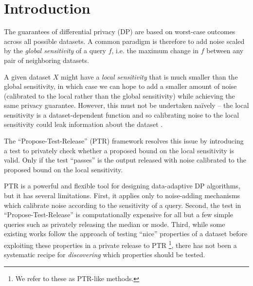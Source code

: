 \section{Introduction}
\label{sec:introduction}
The guarantees of differential privacy (DP) \citep{dwork2006calibrating} are based on worst-case outcomes across all possible datasets. A common paradigm is therefore to add noise scaled by the \emph{global sensitivity} of a query $f$, i.e. the maximum change in $f$ between any pair of neighboring datasets.

A given dataset $X$ might have a \emph{local sensitivity} that is much smaller than the global sensitivity, in which case we can hope to add a smaller amount of noise (calibrated to the local rather than the global sensitivity) while achieving the same privacy guarantee. However, this must not be undertaken na\"{i}vely -- the local sensitivity is a dataset-dependent function and so calibrating noise to the local sensitivity could leak information about the dataset \citep{nissim2007smooth}.

The ``Propose-Test-Release'' (PTR) framework \citep{dwork2009differential} resolves this issue by introducing a test to privately check whether a proposed bound on the local sensitivity is valid. Only if the test ``passes'' is the output released with noise calibrated to the proposed bound on the local sensitivity. 

PTR is a powerful and flexible tool for designing data-adaptive DP algorithms, but it has several limitations. First, it applies only to noise-adding mechanisms which calibrate noise according to the sensitivity of a query. Second, the test in ``Propose-Test-Release'' is computationally expensive for all but a few simple queries such as privately releasing the median or mode.  Third, while some existing works follow the approach of testing ``nice'' properties of a dataset before exploiting these properties in a private release to PTR \footnote{We refer to these as PTR-like methods. }, 
there has not been a systematic recipe for \emph{discovering} which properties should be tested.
    
